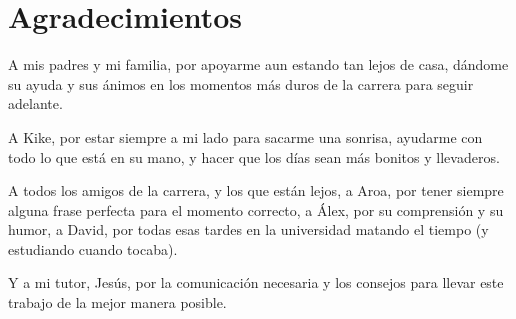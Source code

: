 \chapter*{Agradecimientos}

A mis padres y mi familia, por apoyarme aun estando tan lejos de casa, dándome su ayuda y sus ánimos en los momentos más duros de la carrera para seguir adelante.\newline

A Kike, por estar siempre a mi lado para sacarme una sonrisa, ayudarme con todo lo que está en su mano, y hacer que los días sean más bonitos y llevaderos.\newline

A todos los amigos de la carrera, y los que están lejos, a Aroa, por tener siempre alguna frase perfecta para el momento correcto, a Álex, por su comprensión y su humor, a David, por todas esas tardes en la universidad matando el tiempo (y estudiando cuando tocaba).\newline

Y a mi tutor, Jesús, por la comunicación necesaria y los consejos para llevar este trabajo de la mejor manera posible.\newline


